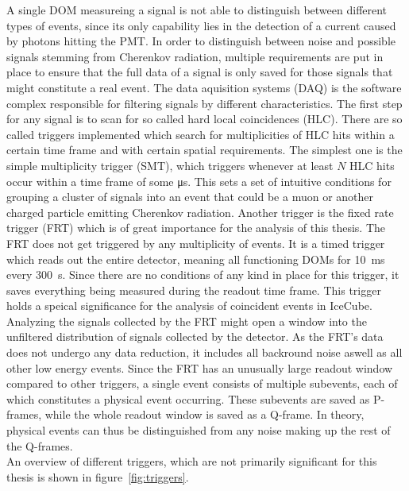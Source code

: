 A single DOM measureing a signal is not able to distinguish between different types of events, since its only capability lies in the detection of a current
caused by photons hitting the PMT\@. In order to distinguish between noise and possible signals stemming from Cherenkov radiation, multiple requirements are
put in place to ensure that the full data of a signal is only saved for those signals that might constitute a real event. The data aquisition systems (DAQ)
is the software complex responsible for filtering signals by different characteristics. The first step for any signal is to scan for so called hard local 
coincidences (HLC). 
There are so called triggers implemented which search for multiplicities of HLC hits within a certain time frame and with certain spatial requirements.
The simplest one is the simple multiplicity trigger (SMT), which triggers whenever at least $N$ HLC hits occur within a time frame of some 
\si{\micro\second}. This sets a set of intuitive conditions for grouping a cluster of signals into an event that could be a muon or another 
charged particle emitting Cherenkov radiation. 
Another trigger is the fixed rate trigger (FRT) which is of great importance for the analysis of this thesis. The FRT does not get triggered 
by any multiplicity of events. It is a timed trigger which reads out the entire detector, meaning all functioning DOMs for \SI{10}{ms}
every \SI{300}{s}. Since there are no conditions of any kind in place for this trigger, it saves everything being measured during the 
readout time frame. This trigger holds a speical significance for the analysis of coincident events in IceCube. 
Analyzing the signals collected by the FRT might open a window into the unfiltered distribution of signals collected by the detector. 
As the FRT's data does not undergo any data reduction, it includes all backround noise aswell as all other low energy events. 
Since the FRT has an unusually large readout window compared to other triggers, a single event consists of multiple subevents, each of which constitutes
a physical event occurring. These subevents are saved as P-frames, while the whole readout window is saved as a Q-frame.
In theory, physical events can thus be distinguished from any noise making up the rest of the Q-frames.\\  
An overview of different triggers, which are not primarily significant for this thesis is shown 
in figure~\ref{fig:triggers}.

